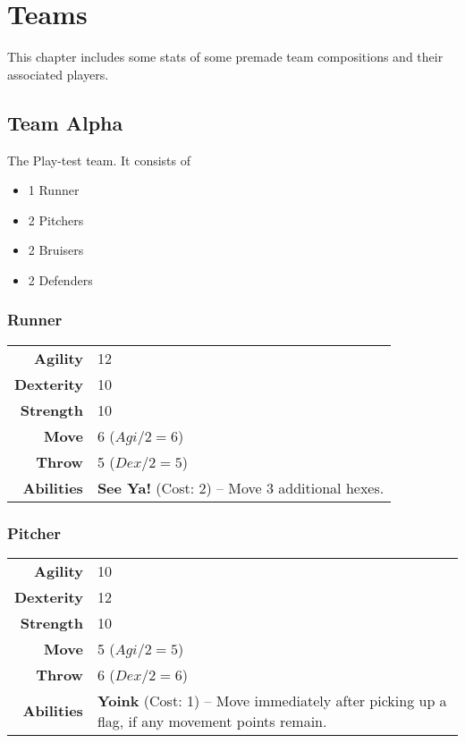 \chapter{Teams}
This chapter includes some stats of some premade team compositions and their associated players.
\section{Team Alpha}
The Play-test team. It consists of
\begin{itemize}
    \item 1 Runner
    \item 2 Pitchers
    \item 2 Bruisers
    \item 2 Defenders
\end{itemize}

\subsection{Runner}
\begin{center}
\begin{tabular}{r|p{5cm}}
    \textbf{Agility} & 12 \\
    \textbf{Dexterity} & 10 \\
    \textbf{Strength} & 10 \\ \hline
    \textbf{Move} & 6 ($Agi/2=6$)\\
    \textbf{Throw} & 5 ($Dex/2=5$) \\ \hline
    \textbf{Abilities} & \textbf{See Ya!} (Cost: 2) -- Move 3 additional hexes.
\end{tabular}
\end{center}

\subsection{Pitcher}
\begin{center}
\begin{tabular}{r|p{5cm}}
    \textbf{Agility} & 10 \\
    \textbf{Dexterity} & 12 \\
    \textbf{Strength} & 10 \\ \hline
    \textbf{Move} & 5 ($Agi/2=5$)\\
    \textbf{Throw} & 6 ($Dex/2=6$) \\ \hline
    \textbf{Abilities} & \textbf{Yoink} (Cost: 1) -- Move immediately after picking up a flag, if any movement points remain.
\end{tabular}
\end{center}

